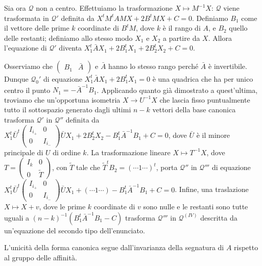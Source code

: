 	\par Sia ora $\mathcal{Q}$ non a centro. Effettuiamo la trasformazione $X \mapsto M^{-1}X$: $\mathcal{Q}$ viene trasformata in $\mathcal{Q}'$ definita da $X^tM^tAMX + 2 B^tMX + C = 0$. Definiamo $B_1$ come il vettore delle prime $k$ coordinate di $B^tM$, dove $k$ \`e il rango di $A$, e $B_2$ quello delle restanti; definiamo allo stesso modo $X_1$ e $X_2$ a partire da $X$. Allora l'equazione di $\mathcal{Q}'$ diventa $X_1^t\bar{A}X_1 + 2B_1^tX_1 + 2B_2^tX_2 + C = 0$.
	\par Osserviamo che $\left ( \begin{array}{c|c} B_1 & \bar{A} \end{array} \right )$ e $\bar{A}$ hanno lo stesso rango perch\'e $\bar{A}$ \`e invertibile. Dunque $\mathcal{Q}_0'$ di equazione $X_1^t\bar{A}X_1 + 2B_1^tX_1 = 0$ \`e una quadrica che ha per unico centro il punto $N_1 = - \bar{A}^{-1}B_1$. Applicando quanto gi\`a dimostrato a quest'ultima, troviamo che un'opportuna isometria $X \rightarrow U^{-1}X$ che lascia fisso puntualmente tutto il sottospazio generato dagli ultimi $n - k$ vettori della base canonica trasforma $\mathcal{Q}'$ in $\mathcal{Q}''$ definita da $X_1^t\bar{U}^t \left ( \begin{array}{c|c} I_{i_+} & 0\\ \hline 0 & I_{i_-} \end{array} \right )\bar{U}X_1 + 2B_2^tX_2 - B_1^t \bar{A}^{-1} B_1 + C = 0$, dove $\bar{U}$ \`e il minore principale di $U$ di ordine $k$. La trasformazione lineare $X \mapsto T^{-1}X$, dove $T = \left ( \begin{array}{c|c} I_{k} & 0\\ \hline 0 & \tilde{T}\end{array} \right )$, con $\tilde{T}$ tale che $\tilde{T}^t B_2 = ( \cdots 1 \cdots)^t$, porta $\mathcal{Q}''$ in $\mathcal{Q}'''$ di equazione $X_1^t\bar{U}^t \left ( \begin{array}{c|c} I_{i_+} & 0\\ \hline 0 & I_{i_-} \end{array} \right ) \bar{U}X_1 + (\cdots 1 \cdots) - B_1^t \bar{A}^{-1} B_1 + C = 0$. Infine, una traslazione $X \mapsto X + v$, dove le prime $k$ coordinate di $v$ sono nulle e le restanti sono tutte uguali a $(n - k)^{-1}(B_1^t \bar{A}^{-1} B_1 - C)$ trasforma $\mathcal{Q}'''$ in $\mathcal{Q}^{(IV)}$ descritta da un'equazione del secondo tipo dell'enunciato.
	\par L'unicit\`a della forma canonica segue dall'invarianza della segnatura di $A$ rispetto al gruppo delle affinit\`a.\EndProof
